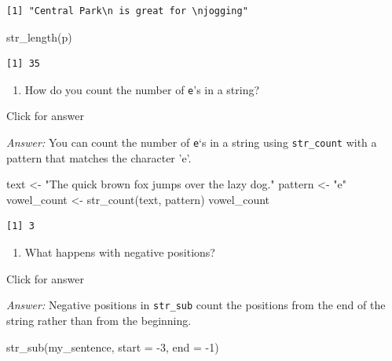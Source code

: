 \documentclass[
]{book}
\newenvironment{Shaded}{\begin{snugshade}}{\end{snugshade}}
\newcommand{\AttributeTok}[1]{\textcolor[rgb]{0.77,0.63,0.00}{#1}}
\newcommand{\DecValTok}[1]{\textcolor[rgb]{0.00,0.00,0.81}{#1}}
\newcommand{\FunctionTok}[1]{\textcolor[rgb]{0.00,0.00,0.00}{#1}}
\newcommand{\NormalTok}[1]{#1}
\newcommand{\OtherTok}[1]{\textcolor[rgb]{0.56,0.35,0.01}{#1}}
\newcommand{\SpecialCharTok}[1]{\textcolor[rgb]{0.00,0.00,0.00}{#1}}
\newcommand{\StringTok}[1]{\textcolor[rgb]{0.31,0.60,0.02}{#1}}
\providecommand{\tightlist}{%
  \setlength{\itemsep}{0pt}\setlength{\parskip}{0pt}}
\begin{document}
\begin{verbatim}
[1] "Central Park\n is great for \njogging"
\end{verbatim}

\begin{Shaded}
\begin{Highlighting}[]
\FunctionTok{str\_length}\NormalTok{(p)}
\end{Highlighting}
\end{Shaded}

\begin{verbatim}
[1] 35
\end{verbatim}

\begin{enumerate}
\def\labelenumi{\alph{enumi}.}
\setcounter{enumi}{5}
\tightlist
\item
  How do you count the number of \texttt{e}'s in a string?
\end{enumerate}

Click for answer

\emph{Answer:} You can count the number of \texttt{e}`s in a string using \texttt{str\_count} with a pattern that matches the character 'e'.

\begin{Shaded}
\begin{Highlighting}[]
\NormalTok{text }\OtherTok{\textless{}{-}} \StringTok{"The quick brown fox jumps over the lazy dog."}
\NormalTok{pattern }\OtherTok{\textless{}{-}} \StringTok{"e"}
\NormalTok{vowel\_count }\OtherTok{\textless{}{-}} \FunctionTok{str\_count}\NormalTok{(text, pattern)}
\NormalTok{vowel\_count}
\end{Highlighting}
\end{Shaded}

\begin{verbatim}
[1] 3
\end{verbatim}

\begin{enumerate}
\def\labelenumi{\alph{enumi}.}
\setcounter{enumi}{6}
\tightlist
\item
  What happens with negative positions?
\end{enumerate}

Click for answer

\emph{Answer:} Negative positions in \texttt{str\_sub} count the positions from the end of the string rather than from the beginning.

\begin{Shaded}
\begin{Highlighting}[]
\FunctionTok{str\_sub}\NormalTok{(my\_sentence, }\AttributeTok{start =} \SpecialCharTok{{-}}\DecValTok{3}\NormalTok{, }\AttributeTok{end =} \SpecialCharTok{{-}}\DecValTok{1}\NormalTok{)}
\end{Highlighting}
\end{Shaded}
\end{document}

